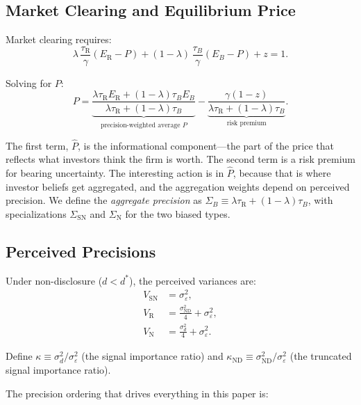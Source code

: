 \documentclass[12pt]{article}
\theoremstyle{plain}
\theoremstyle{definition}
\newcommand{\ND}{\mathrm{ND}}
\newcommand{\R}{\mathrm{R}}
\newcommand{\SN}{\mathrm{SN}}
\newcommand{\N}{\mathrm{N}}
\begin{document}
\subsection{Market Clearing and Equilibrium Price}

Market clearing requires:
\[
\lambda\,\frac{\tau_\R}{\gamma}(E_\R - P) + (1-\lambda)\,\frac{\tau_B}{\gamma}(E_B - P) + z = 1.
\]

Solving for $P$:
\begin{equation}
\boxed{P = \underbrace{\frac{\lambda\tau_\R E_\R + (1-\lambda)\tau_B E_B}{\lambda\tau_\R + (1-\lambda)\tau_B}}_{\text{precision-weighted average } \hat{P}} - \underbrace{\frac{\gamma(1-z)}{\lambda\tau_\R + (1-\lambda)\tau_B}}_{\text{risk premium}}.}
\label{eq:trading_price}
\end{equation}

The first term, $\hat{P}$, is the informational component---the part of the price that reflects what investors think the firm is worth. The second term is a risk premium for bearing uncertainty. The interesting action is in $\hat{P}$, because that is where investor beliefs get aggregated, and the aggregation weights depend on perceived precision. We define the \emph{aggregate precision} as $\Sigma_B \equiv \lambda\tau_\R + (1-\lambda)\tau_B$, with specializations $\Sigma_\SN$ and $\Sigma_\N$ for the two biased types.

\subsection{Perceived Precisions}
\label{sec:precisions}

Under non-disclosure ($d < d^*$), the perceived variances are:
\begin{align}
V_\SN &= \sigma_\varepsilon^2, \label{eq:var_sn}\\
V_\R &= \frac{\sigma_{\ND}^2}{4} + \sigma_\varepsilon^2, \label{eq:var_r}\\
V_\N &= \frac{\sigma_d^2}{4} + \sigma_\varepsilon^2. \label{eq:var_n}
\end{align}

Define $\kappa \equiv \sigma_d^2/\sigma_\varepsilon^2$ (the signal importance ratio) and $\kappa_{\ND} \equiv \sigma_{\ND}^2/\sigma_\varepsilon^2$ (the truncated signal importance ratio).

The precision ordering that drives everything in this paper is:
\end{document}
